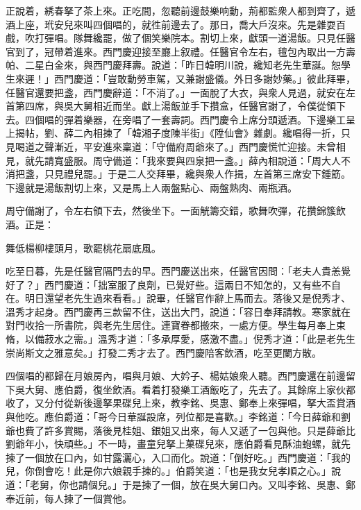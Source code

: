 正說着，綉春拏了茶上來。正吃間，忽聽前邊鼓樂响動，荊都監衆人都到齊了，遞酒上座，玳安兒來叫四個唱的，就徃前邊去了。那日，喬大戶沒來。先是雜耍百戲，吹打彈唱。隊舞纔罷，做了個笑樂院本。割切上來，獻頭一道湯飯。只見任醫官到了，冠帶着進來。西門慶迎接至廳上叙禮。任醫官令左右，氊包內取出一方壽帕、二星白金來，與西門慶拜壽。說道：「昨日韓明川說，纔知老先生華誕。恕學生來遲！」西門慶道：「豈敢動勞車駕，又兼謝盛儀。外日多謝妙藥。」彼此拜畢，任醫官還要把盞，西門慶辭道：「不消了。」一面脫了大衣，與衆人見過，就安在左首第四席，與吳大舅相近而坐。獻上湯飯並手下攢盒，任醫官謝了，令僕從領下去。四個唱的彈着樂器，在旁唱了一套壽詞。西門慶令上席分頭遞酒。下邊樂工呈上揭帖，劉、薛二內相揀了「韓湘子度陳半街」《陞仙會》雜劇。纔唱得一折，只見喝道之聲漸近，平安進來稟道：「守備府周爺來了。」西門慶慌忙迎接。未曾相見，就先請寬盛服。周守備道：「我來要與四泉把一盞。」薛內相說道：「周大人不消把盞，只見禮兒罷。」于是二人交拜畢，纔與衆人作揖，左首第三席安下鍾筯。下邊就是湯飯割切上來，又是馬上人兩盤點心、兩盤熟肉、兩瓶酒。

周守備謝了，令左右領下去，然後坐下。一面觥籌交錯，歌舞吹彈，花攢錦簇飲酒。正是：

\begin{myquote} 
舞低楊柳樓頭月，歌罷桃花扇底風。
\end{myquote} 

吃至日暮，先是任醫官隔門去的早。西門慶送出來，任醫官因問：「老夫人貴恙覺好了？」西門慶道：「拙室服了良劑，已覺好些。這兩日不知怎的，又有些不自在。明日還望老先生過來看看。」說畢，任醫官作辭上馬而去。落後又是倪秀才、溫秀才起身。西門慶再三款留不住，送出大門，說道：「容日奉拜請教。寒家就在對門收拾一所書院，與老先生居住。連寶眷都搬來，一處方便。學生每月奉上束脩，以備菽水之需。」溫秀才道：「多承厚愛，感激不盡。」倪秀才道：「此是老先生崇尚斯文之雅意矣。」打發二秀才去了。西門慶陪客飲酒，吃至更闌方散。

四個唱的都歸在月娘房內，唱與月娘、大妗子、楊姑娘衆人聽。西門慶還在前邊留下吳大舅、應伯爵，復坐飲酒。看着打發樂工酒飯吃了，先去了。其餘席上家伙都收了，又分付從新後邊拏果碟兒上來，教李銘、吳惠、鄭奉上來彈唱，拏大盃賞酒與他吃。應伯爵道：「哥今日華誕設席，列位都是喜歡。」李銘道：「今日薛爺和劉爺也費了許多賞賜，落後見桂姐、銀姐又出來，每人又遞了一包與他。只是薛爺比劉爺年小，快頑些。」不一時，畫童兒拏上菓碟兒來，應伯爵看見酥油蚫螺，就先揀了一個放在口內，如甘露灑心，入口而化。說道：「倒好吃。」西門慶道：「我的兒，你倒會吃！此是你六娘親手揀的。」伯爵笑道：「也是我女兒孝順之心。」說道：「老舅，你也請個兒。」于是揀了一個，放在吳大舅口內。又叫李銘、吳惠、鄭奉近前，每人揀了一個賞他。

